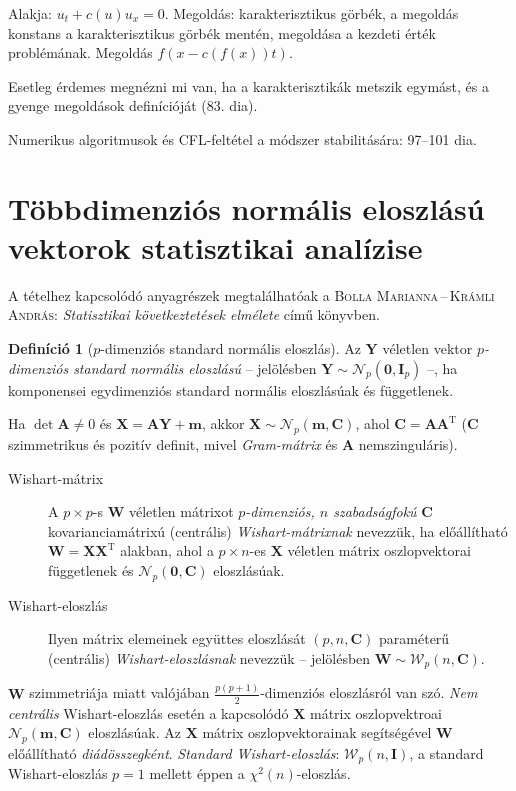\documentclass[%
	DIV=15,appendixprefix]{scrreprt}
\theoremstyle{definition}
\newtheorem*{defin}{Definíció}
\theoremstyle{remark}
\newcommand{\normald}{\mathcal{N}}
\newcommand{\wishartd}{\mathcal{W}}
\DeclareMathOperator{\T}{T}
\begin{document}
Alakja: $ u_t + c \left( u \right) u_x = 0 $. Megoldás: karakterisztikus görbék, a megoldás konstans
a karakterisztikus görbék mentén, megoldása a kezdeti érték problémának. Megoldás $ f \left( x - c \left( f \left( x \right) \right) t \right)$.

Esetleg érdemes megnézni mi van, ha a karakterisztikák metszik egymást, és a gyenge megoldások
definícióját (83. dia).

Numerikus algoritmusok és CFL-feltétel a módszer stabilitására: 97--101 dia.
%
\section{Többdimenziós normális eloszlású vektorok statisztikai analízise}
A tételhez kapcsolódó anyagrészek megtalálhatóak a \textsc{Bolla Marianna\,--\,Krámli András}:
\emph{Statisztikai következtetések elmélete} \cite{BollaKramli} című könyvben.

\begin{defin}[$ p $-dimenziós standard normális eloszlás] Az $ \mathbf{ Y } $ véletlen vektor
	\emph{$ p $-dimenziós standard normális eloszlású} -- jelölésben $ \mathbf{ Y } \sim
	\normald_{ p } \left( \mathbf{ 0 },{} \mathbf{ I }_{ p } \right) $ --, ha komponensei
	egydimenziós standard normális eloszlásúak és függetlenek.
\end{defin}
Ha $ \det \mathbf{ A } \neq 0 $ és $ \mathbf{ X } = \mathbf{ A } \mathbf{ Y } + \mathbf{ m } $,
akkor $ \mathbf{ X } \sim \normald_{ p } \left( \mathbf{ m },{} \mathbf{ C } \right) $, ahol
$ \mathbf{ C } = \mathbf{ A } \mathbf{ A }^{ \T } $ ($ \mathbf{ C } $ szimmetrikus és pozitív
definit, mivel \emph{Gram-mátrix} és $ \mathbf{ A } $ nemszinguláris).
%
\leavevmode
\begin{description}
	\item[Wishart-mátrix] A $ p \times  p $-s $ \mathbf{ W } $ véletlen mátrixot
		\emph{$ p $-dimenziós, $ n $ szabadságfokú} $ \mathbf{ C } $ kovarianciamátrixú (centrális)
		\emph{Wishart-mátrixnak} nevezzük, ha előállítható $ \mathbf{ W } = \mathbf{ X }
		\mathbf{ X }^{ \T } $ alakban, ahol a $ p \times n $-es $ \mathbf{ X } $ véletlen mátrix
		oszlopvektorai függetlenek és $ \normald_{ p } \left( \mathbf{ 0 },{} \mathbf{ C } \right) $
		eloszlásúak.
	\item[Wishart-eloszlás] Ilyen mátrix elemeinek együttes eloszlását $ \left( p,{} n,{}
		\mathbf{ C } \right) $ paraméterű (centrális) \emph{Wi\-shart-eloszlásnak} nevezzük --
		jelölésben $ \mathbf{ W } \sim \wishartd_{ p } \left( n,{} \mathbf{ C } \right) $.
\end{description}
$ \mathbf{ W } $ szimmetriája miatt valójában $ \frac{ p
\left( p + 1 \right) }{ 2 } $-dimenziós eloszlásról van szó. \emph{Nem centrális} Wishart-eloszlás
esetén a kapcsolódó $ \mathbf{ X } $ mátrix oszlopvektroai $ \normald_{ p } \left( \mathbf{ m },{}
\mathbf{ C } \right) $ eloszlásúak. Az $ \mathbf{ X } $ mátrix oszlopvektorainak segítségével
$ \mathbf{ W } $ előállítható \emph{diádösszegként}. \emph{Standard Wishart-eloszlás}:
$ \wishartd_{ p } \left( n,{} \mathbf{ I } \right) $, a standard Wishart-eloszlás $ p  = 1 $ mellett
éppen a $ \chi^{ 2 } \left( n \right) $-eloszlás.
\end{document}

